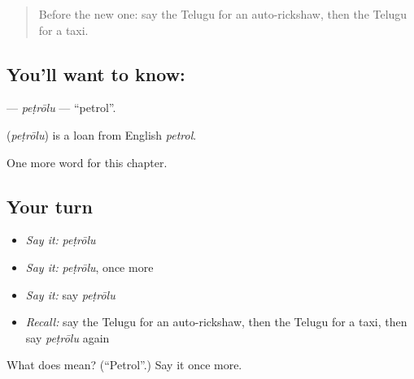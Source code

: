 \label{lesson:TE-C301-petrolu}



\begin{quote}
Before the new one: say the Telugu for an auto-rickshaw, then the Telugu for a taxi.
\end{quote}

\subsection*{You'll want to know: }
\textbf{} — \emph{peṭrōlu} — \textquotedblleft{}petrol\textquotedblright{}.

\begin{cousinweb}
\textbf{} (\emph{peṭrōlu}) is a loan from English \emph{petrol}.
\end{cousinweb}

\begin{grammarlens}[title={What you've built}]
One more word for this chapter.
\end{grammarlens}

\subsection*{Your turn}
\begin{itemize}
\raggedright
  \item \emph{Say it:} \emph{peṭrōlu}
  \item \emph{Say it:} \emph{peṭrōlu}, once more
  \item \emph{Say it:} say \emph{peṭrōlu}
  \item \emph{Recall:} say the Telugu for an auto-rickshaw, then the Telugu for a taxi, then say \emph{peṭrōlu} again
\end{itemize}

\begin{tcolorbox}[breakable,colback=teal!4,colframe=teal!35!black,title={Before you move on}]
What does  mean? (\textquotedblleft{}Petrol\textquotedblright{}.) Say it once more.
\end{tcolorbox}
